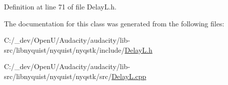 Definition at line 71 of file Delay\+L.\+h.



The documentation for this class was generated from the following files\+:\begin{DoxyCompactItemize}
\item 
C\+:/\+\_\+dev/\+Open\+U/\+Audacity/audacity/lib-\/src/libnyquist/nyquist/nyqstk/include/\hyperlink{_delay_l_8h}{Delay\+L.\+h}\item 
C\+:/\+\_\+dev/\+Open\+U/\+Audacity/audacity/lib-\/src/libnyquist/nyquist/nyqstk/src/\hyperlink{_delay_l_8cpp}{Delay\+L.\+cpp}\end{DoxyCompactItemize}

